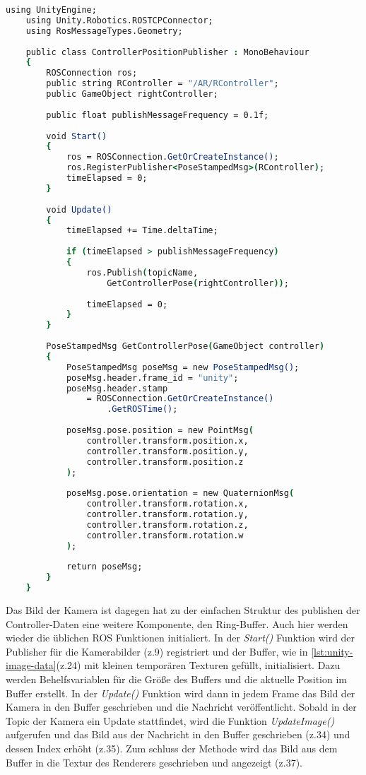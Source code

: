 \noindent
\begin{lstlisting}[language=csh, caption=Abgreifen der Controller Daten, label=lst:unity-controller-data]
    using UnityEngine;
    using Unity.Robotics.ROSTCPConnector;
    using RosMessageTypes.Geometry;
    
    public class ControllerPositionPublisher : MonoBehaviour
    {
        ROSConnection ros;
        public string RController = "/AR/RController";
        public GameObject rightController;
        
        public float publishMessageFrequency = 0.1f;
    
        void Start()
        {
            ros = ROSConnection.GetOrCreateInstance();
            ros.RegisterPublisher<PoseStampedMsg>(RController);
            timeElapsed = 0;
        }
    
        void Update()
        {
            timeElapsed += Time.deltaTime;
    
            if (timeElapsed > publishMessageFrequency)
            {
                ros.Publish(topicName,
                    GetControllerPose(rightController));
    
                timeElapsed = 0;
            }
        }
    
        PoseStampedMsg GetControllerPose(GameObject controller)
        {
            PoseStampedMsg poseMsg = new PoseStampedMsg();
            poseMsg.header.frame_id = "unity";
            poseMsg.header.stamp
                = ROSConnection.GetOrCreateInstance()
                    .GetROSTime();
            
            poseMsg.pose.position = new PointMsg(
                controller.transform.position.x,
                controller.transform.position.y,
                controller.transform.position.z
            );
            
            poseMsg.pose.orientation = new QuaternionMsg(
                controller.transform.rotation.x,
                controller.transform.rotation.y,
                controller.transform.rotation.z,
                controller.transform.rotation.w
            );
    
            return poseMsg;
        }
    }
\end{lstlisting}
Das Bild der Kamera ist dagegen hat zu der einfachen Struktur des publishen der Controller-Daten eine weitere Komponente, den Ring-Buffer. Auch hier werden wieder die üblichen \ac{ROS} Funktionen initialiert. In der \textit{Start()} Funktion wird der Publisher für die Kamerabilder (z.9) registriert und der Buffer, wie in \autoref{lst:unity-image-data}(z.24) mit kleinen temporären Texturen gefüllt, initialisiert. Dazu werden Behelfsvariablen für die Größe des Buffers und die aktuelle Position im Buffer erstellt. In der \textit{Update()} Funktion wird dann in jedem Frame das Bild der Kamera in den Buffer geschrieben und die Nachricht veröffentlicht. Sobald in der Topic der Kamera ein Update stattfindet, wird die Funktion \textit{UpdateImage()} aufgerufen und das Bild aus der Nachricht in den Buffer geschrieben (z.34) und dessen Index erhöht (z.35). Zum schluss der Methode wird das Bild aus dem Buffer in die Textur des Renderers geschrieben und angezeigt (z.37).\\
